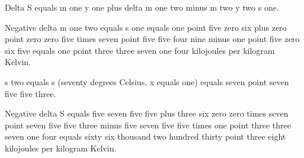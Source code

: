 Delta S equals m one y one plus delta m one two minus m two y two s one.

Negative delta m one two equals s one equals one point five zero six plus zero point zero zero five times seven point five five four nine minus one point five zero six five equals one point three three seven one four kilojoules per kilogram Kelvin.

s two equals s (seventy degrees Celsius, x equals one) equals seven point seven five five three.

Negative delta S equals five seven five five plus three six zero zero times seven point seven five five three minus five seven five five times one point three three seven one four equals sixty six thousand two hundred thirty point three eight kilojoules per kilogram Kelvin.